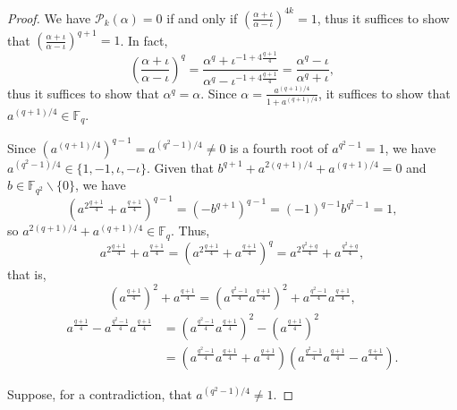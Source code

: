 \documentclass[12pt]{amsart}
\theoremstyle{remark}
\theoremstyle{definition}
\begin{document}
\begin{proof}
    We have $\mathcal{P}_{k}(\alpha) = 0$ if and only if
    $\left(\frac{\alpha+\iota}{\alpha-\iota}\right)^{4k} = 1$, thus it suffices
    to show that $\left(\frac{\alpha+\iota}{\alpha-\iota}\right)^{q+1} = 1$.
    In fact,
    \[
        \left(\frac{\alpha+\iota}{\alpha-\iota}\right)^{q}
        = \frac{\alpha^{q}+\iota^{-1+4\frac{q+1}{4}}}
               {\alpha^{q}-\iota^{-1+4\frac{q+1}{4}}}
        = \frac{\alpha^{q}-\iota}{\alpha^{q}+\iota},
    \]
    thus it suffices to show that $\alpha^{q} = \alpha$. Since
    $\alpha = \frac{a^{(q+1)/4}}{1+a^{(q+1)/4}}$, it suffices to show that
    $a^{(q+1)/4} \in \mathbb{F}_{q}$.

    Since $(a^{(q+1)/4})^{q-1} = a^{(q^{2}-1)/4} \neq 0$ is a fourth root of
    $a^{q^{2}-1} = 1$, we have
    $a^{(q^{2}-1)/4} \in \{1, -1, \iota, -\iota\}$.
    Given that $b^{q+1} + a^{2(q+1)/4} + a^{(q+1)/4} = 0$ and
    $b \in \mathbb{F}_{q^{2}} \smallsetminus \{0\}$, we have
    \[
        \left(a^{2\frac{q+1}{4}} + a^{\frac{q+1}{4}}\right)^{q-1}
        = \left(-b^{q+1}\right)^{q-1}
        = (-1)^{q-1} b^{q^{2}-1} = 1,
    \]
    so $a^{2(q+1)/4} + a^{(q+1)/4} \in \mathbb{F}_{q}$. Thus,
    \[
        a^{2\frac{q+1}{4}} + a^{\frac{q+1}{4}}
        = \left(a^{2\frac{q+1}{4}} + a^{\frac{q+1}{4}}\right)^{q}
        = a^{2\frac{q^{2}+q}{4}} + a^{\frac{q^{2}+q}{4}},
    \]
    that is,
    \[
        \left(a^{\frac{q+1}{4}}\right)^{2} + a^{\frac{q+1}{4}}
        = \left(a^{\frac{q^{2}-1}{4}} a^{\frac{q+1}{4}}\right)^{2}
          + a^{\frac{q^{2}-1}{4}} a^{\frac{q+1}{4}},
    \]
    \begin{align*}
        a^{\frac{q+1}{4}} - a^{\frac{q^{2}-1}{4}} a^{\frac{q+1}{4}}
        &= \left(a^{\frac{q^{2}-1}{4}} a^{\frac{q+1}{4}}\right)^{2}
           - \left(a^{\frac{q+1}{4}}\right)^{2} \\
        &= \left(a^{\frac{q^{2}-1}{4}} a^{\frac{q+1}{4}} + a^{\frac{q+1}{4}}\right)
           \left(a^{\frac{q^{2}-1}{4}} a^{\frac{q+1}{4}} - a^{\frac{q+1}{4}}\right).
    \end{align*}

    Suppose, for a contradiction, that $a^{(q^{2}-1)/4} \neq 1$. 
    

\end{proof}
\end{document}
